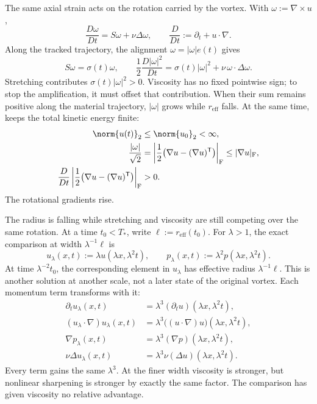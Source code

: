 The same axial strain acts on the rotation carried by the vortex.
With \(\omega:=\nabla\times u\),
\[
  \frac{D\omega}{Dt}
  =
  S\omega+\nu\Delta\omega,
  \qquad
  \frac{D}{Dt}
  :=
  \partial_t+u\cdot\nabla.
\]
Along the tracked trajectory, the alignment \(\omega=|\omega|e(t)\) gives
\[
  S\omega
  =
  \sigma(t)\omega,
  \qquad
  \frac12\frac{D|\omega|^2}{Dt}
  =
  \sigma(t)|\omega|^2
  +
  \nu\,\omega\cdot\Delta\omega.
\]
Stretching contributes \(\sigma(t)|\omega|^2>0\).
Viscosity has no fixed pointwise sign; to stop the amplification, it must offset that contribution.
When their sum remains positive along the material trajectory, \(|\omega|\) grows while \(r_{\mathrm{eff}}\) falls.
At the same time,  keeps the total kinetic energy finite:
\[
\begin{aligned}
  \norm{u(t)}_2
  &\leq
  \norm{u_0}_2
  <
  \infty,
  \\
  \frac{|\omega|}{\sqrt2}
  &=
  \left|\frac12\bigl(\nabla u-(\nabla u)^{\mathsf T}\bigr)\right|_{\mathrm F}
  \leq
  |\nabla u|_{\mathrm F},
  \\
  \frac{D}{Dt}
  \left|\frac12\bigl(\nabla u-(\nabla u)^{\mathsf T}\bigr)\right|_{\mathrm F}
  &>
  0.
\end{aligned}
\]
The rotational gradients rise.


The radius is falling while stretching and viscosity are still competing over the same rotation.
At a time \(t_0<T_*\), write \(\ell:=r_{\mathrm{eff}}(t_0)\).
For \(\lambda>1\), the exact \NavierStokes{} comparison at width \(\lambda^{-1}\ell\) is
\[
  u_\lambda(x,t)
  :=
  \lambda u(\lambda x,\lambda^2t),
  \qquad
  p_\lambda(x,t)
  :=
  \lambda^2p(\lambda x,\lambda^2t).
\]
At time \(\lambda^{-2}t_0\), the corresponding element in \(u_\lambda\) has effective radius \(\lambda^{-1}\ell\).
This is another solution at another scale, not a later state of the original vortex.
Each momentum term transforms with it:
\[
\begin{aligned}
  \partial_tu_\lambda(x,t)
  &=
  \lambda^3(\partial_tu)(\lambda x,\lambda^2t),
  \\
  (u_\lambda\cdot\nabla)u_\lambda(x,t)
  &=
  \lambda^3\bigl((u\cdot\nabla)u\bigr)(\lambda x,\lambda^2t),
  \\
  \nabla p_\lambda(x,t)
  &=
  \lambda^3(\nabla p)(\lambda x,\lambda^2t),
  \\
  \nu\Delta u_\lambda(x,t)
  &=
  \lambda^3\nu(\Delta u)(\lambda x,\lambda^2t).
\end{aligned}
\]
Every term gains the same \(\lambda^3\).
At the finer width viscosity is stronger, but nonlinear sharpening is stronger by exactly the same factor.
The comparison has given viscosity no relative advantage.

